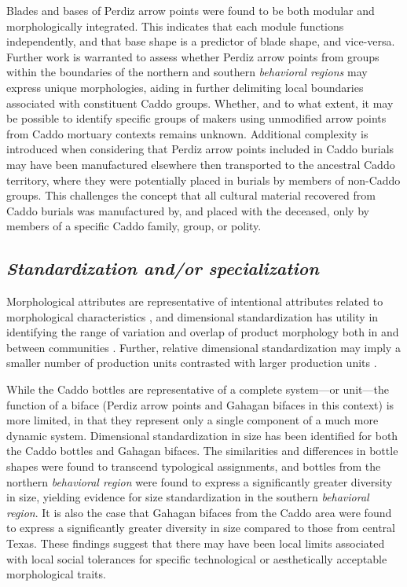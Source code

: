 \documentclass[smallextended]{svjour3}       %
\begin{document}
Blades and bases of Perdiz arrow points were found to be both modular
and morphologically integrated. This indicates that each module
functions independently, and that base shape is a predictor of blade
shape, and vice-versa. Further work is warranted to assess whether
Perdiz arrow points from groups within the boundaries of the northern
and southern \emph{behavioral regions} may express unique morphologies,
aiding in further delimiting local boundaries associated with
constituent Caddo groups. Whether, and to what extent, it may be
possible to identify specific groups of makers using unmodified arrow
points from Caddo mortuary contexts remains unknown. Additional
complexity is introduced when considering that Perdiz arrow points
included in Caddo burials may have been manufactured elsewhere then
transported to the ancestral Caddo territory, where they were
potentially placed in burials by members of non-Caddo groups. This
challenges the concept that all cultural material recovered from Caddo
burials was manufactured by, and placed with the deceased, only by
members of a specific Caddo family, group, or polity.

\hypertarget{standardization-andor-specialization}{%
\subsection{\texorpdfstring{\emph{Standardization and/or
specialization}}{Standardization and/or specialization}}\label{standardization-andor-specialization}}

Morphological attributes are representative of intentional attributes
related to morphological characteristics \cite{RN7051}, and dimensional
standardization has utility in identifying the range of variation and
overlap of product morphology both in and between communities
\cite{RN5779}. Further, relative dimensional standardization may imply a
smaller number of production units contrasted with larger production
units \cite{RN7051}.

While the Caddo bottles are representative of a complete system---or
unit---the function of a biface (Perdiz arrow points and Gahagan bifaces
in this context) is more limited, in that they represent only a single
component of a much more dynamic system. Dimensional standardization in
size has been identified for both the Caddo bottles and Gahagan bifaces.
The similarities and differences in bottle shapes were found to
transcend typological assignments, and bottles from the northern
\emph{behavioral region} were found to express a significantly greater
diversity in size, yielding evidence for size standardization in the
southern \emph{behavioral region}. It is also the case that Gahagan
bifaces from the Caddo area were found to express a significantly
greater diversity in size compared to those from central Texas. These
findings suggest that there may have been local limits associated with
local social tolerances for specific technological or aesthetically
acceptable morphological traits.
\end{document}
